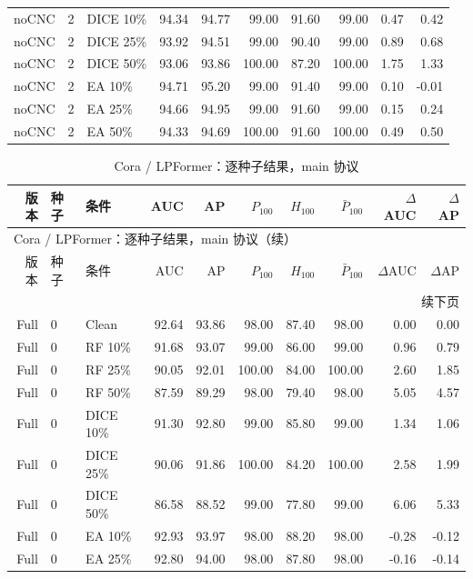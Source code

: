 {\begin{longtable}{rllrrrrrrr}
noCNC & 2 & DICE 10\% & 94.34 & 94.77 & 99.00 & 91.60 & 99.00 & 0.47 & 0.42 \\
noCNC & 2 & DICE 25\% & 93.92 & 94.51 & 99.00 & 90.40 & 99.00 & 0.89 & 0.68 \\
noCNC & 2 & DICE 50\% & 93.06 & 93.86 & 100.00 & 87.20 & 100.00 & 1.75 & 1.33 \\
noCNC & 2 & EA 10\% & 94.71 & 95.20 & 99.00 & 91.40 & 99.00 & 0.10 & -0.01 \\
noCNC & 2 & EA 25\% & 94.66 & 94.95 & 99.00 & 91.60 & 99.00 & 0.15 & 0.24 \\
noCNC & 2 & EA 50\% & 94.33 & 94.69 & 100.00 & 91.60 & 100.00 & 0.49 & 0.50 \\
\end{longtable}
}

{\footnotesize
\setlength{\tabcolsep}{3.2pt}
\renewcommand{\arraystretch}{1.10}
\begin{longtable}{rllrrrrrrr}
\caption{Cora / LPFormer：逐种子结果，main 协议}\\
\toprule
版本 & 种子 & 条件 & AUC & AP & $P_{100}$ & $H_{100}$ & $\bar P_{100}$ & $\Delta$AUC & $\Delta$AP \\
\midrule
\endfirsthead
\multicolumn{10}{l}{Cora / LPFormer：逐种子结果，main 协议（续）}\\
\toprule
版本 & 种子 & 条件 & AUC & AP & $P_{100}$ & $H_{100}$ & $\bar P_{100}$ & $\Delta$AUC & $\Delta$AP \\
\midrule
\endhead
\midrule\multicolumn{10}{r}{续下页}\\
\endfoot
\bottomrule
\endlastfoot
Full & 0 & Clean & 92.64 & 93.86 & 98.00 & 87.40 & 98.00 & 0.00 & 0.00 \\
Full & 0 & RF 10\% & 91.68 & 93.07 & 99.00 & 86.00 & 99.00 & 0.96 & 0.79 \\
Full & 0 & RF 25\% & 90.05 & 92.01 & 100.00 & 84.00 & 100.00 & 2.60 & 1.85 \\
Full & 0 & RF 50\% & 87.59 & 89.29 & 98.00 & 79.40 & 98.00 & 5.05 & 4.57 \\
Full & 0 & DICE 10\% & 91.30 & 92.80 & 99.00 & 85.80 & 99.00 & 1.34 & 1.06 \\
Full & 0 & DICE 25\% & 90.06 & 91.86 & 100.00 & 84.20 & 100.00 & 2.58 & 1.99 \\
Full & 0 & DICE 50\% & 86.58 & 88.52 & 99.00 & 77.80 & 99.00 & 6.06 & 5.33 \\
Full & 0 & EA 10\% & 92.93 & 93.97 & 98.00 & 88.20 & 98.00 & -0.28 & -0.12 \\
Full & 0 & EA 25\% & 92.80 & 94.00 & 98.00 & 87.80 & 98.00 & -0.16 & -0.14 \\

\end{longtable}}
